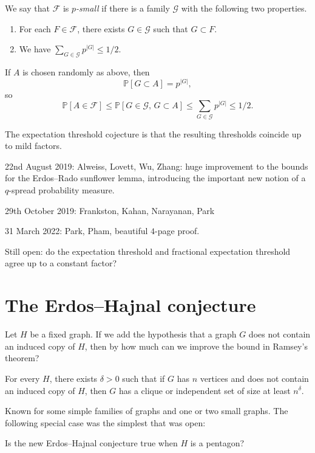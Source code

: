 \documentclass[reqno]{amsart} 
\begin{document}
We say that $\mathcal{F}$ is $p$\emph{-small} if there is a family $\mathcal{G}$ with the following two properties.
\begin{enumerate}
\item For each $F \in \mathcal{F}$, there exists $G \in \mathcal{G}$ such that $G \subset F$.
\item We have $\sum_{G \in \mathcal{G}} p^{\lvert G \rvert} \leq 1/2$.
\end{enumerate}
If $A$ is chosen randomly as above, then
\begin{equation*}
  \mathbb{P}[G \subset A] = p^{\lvert G \rvert},
\end{equation*}
so
\begin{equation*}
  \mathbb{P}[A \in \mathcal{F}]
  \leq \mathbb{P}[G \in \mathcal{G}, \,G \subset A]
  \leq \sum_{G \in \mathcal{G}} p^{\lvert G \rvert} \leq 1/2.
\end{equation*}

The expectation threshold cojecture is that the resulting thresholds coincide up to mild factors.

22nd August 2019: Alweiss, Lovett, Wu, Zhang: huge improvement to the bounds for the Erdos--Rado sunflower lemma, introducing the important new notion of a $q$-spread probability measure.

29th October 2019: Frankston, Kahan, Narayanan, Park

31 March 2022: Park, Pham, beautiful $4$-page proof.

Still open: do the expectation threshold and fractional expectation threshold agree up to a constant factor?


\section{The Erdos--Hajnal conjecture}
Let $H$ be a fixed graph.  If we add the hypothesis that a graph $G$ does not contain an induced copy of $H$, then by how much can we improve the bound in Ramsey's theorem?

\begin{conjecture}  For every $H$, there exists $\delta > 0$ such that if $G$ has $n$ vertices and does not contain an induced copy of $H$, then $G$ has a clique or independent set of size at least $n^\delta$.
\end{conjecture}
Known for some simple families of graphs and one or two small graphs.  The following special case was the simplest that was open:
\begin{question}
  Is the new Erdos--Hajnal conjecture true when $H$ is a pentagon?
\end{question}
\end{document}
